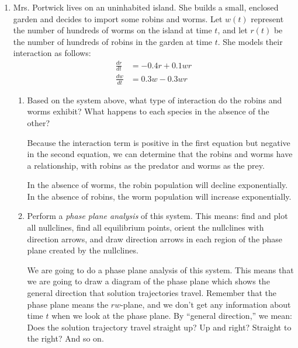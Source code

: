 \documentclass[main]{subfiles}
\begin{document}
\begin{enumerate}  
    
\item  %

Mrs. Portwick lives on an uninhabited island.  She builds
a small, enclosed garden and decides to import some robins and worms. Let $w(t)$ represent the
number of hundreds of worms on the island at time $t$, and let $r(t)$ be
the number of hundreds of robins in the garden at time $t$.  She
models their interaction as follows:
\begin{align*}
\frac{dr}{dt} & = -0.4r + 0.1wr \\
\frac{dw}{dt} & = 0.3w - 0.3wr
\end{align*}

\begin{enumerate}
\item 
\begin{problem}[0.5in]
Based on the system above, what type of interaction do the robins and worms exhibit? What happens to each species in the absence of the other?
\end{problem}

\begin{solution}
Because the interaction term is positive in the first equation but negative in the second equation, we can determine that the robins and worms have a  relationship, with robins as the predator and worms as the prey.

In the absence of worms, the robin population will decline exponentially. In the absence of robins, the worm population will increase exponentially.

\end{solution}


\item 
\begin{problem}[\vfill]
Perform a \textit{phase plane analysis} of this system. This means: find and plot all nullclines,
find all equilibrium points, orient the nullclines with direction arrows, and draw direction arrows in each region of the phase plane created by the nullclines. 
\end{problem}

\begin{solution}
We are going to do a phase plane analysis of this system.  This means
that we are going to draw a diagram of the phase plane which shows the
general direction that solution trajectories travel.  Remember that
the phase plane means the $rw$-plane, and we don't get any information
about time $t$ when we look at the phase plane.  By ``general
direction,'' we mean: Does the solution trajectory travel straight up?
Up and right?  Straight to the right?  And so on.


\end{solution}
\end{enumerate}
\end{enumerate}
\end{document}
